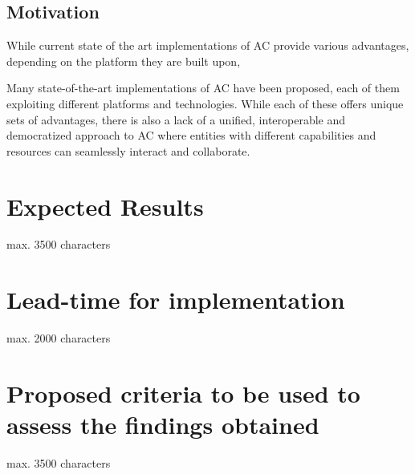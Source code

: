 \documentclass[12pt]{article}
\begin{document}
\subsection{Motivation}
While current state of the art implementations of AC provide various advantages, depending on the platform they are built upon, 

Many state-of-the-art implementations of AC have been proposed, each of them exploiting different platforms
and technologies. While each of these offers unique sets of advantages, there is also a lack of a unified, interoperable 
and democratized approach to AC where entities with different capabilities and resources can seamlessly interact and collaborate.

\newpage
\section{Expected Results}
max. 3500 characters

\newpage
\section{Lead-time for implementation}
max. 2000 characters

\newpage
\section{Proposed criteria to be used to assess the findings obtained}
max. 3500 characters

\clearpage

\renewcommand{\refname}{References}



\end{document}
